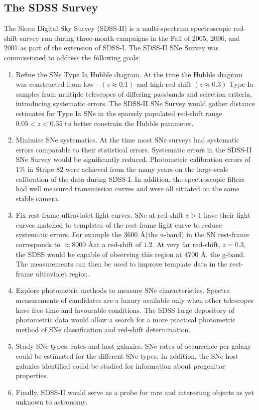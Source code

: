 \subsection{The SDSS Survey}
The Sloan Digital Sky Survey (SDSS-II) is a multi-spectrum spectroscopic red-shift survey run during three-month campaigns in the Fall of 2005, 2006, and 2007 as part of the extension of SDSS-I.
The SDSS-II SNe Survey was commissioned to address the following goals\citep{abazajian2009seventh}:
\begin{enumerate}
\item Refine the SNe Type Ia Hubble diagram.
At the time the Hubble diagram  was constructed from low - $(z \approx 0.1)$ and high-red-shift $(z \approx 0.3)$ Type Ia samples from multiple telescopes of differing passbands and selection criteria, introducing systematic errors.
The SDSS-II SNe Survey would gather distance estimates for Type Ia SNe in the sparsely populated red-shift range $0.05 < z < 0.35$ to better constrain the Hubble parameter.
\item Minimise SNe systematics.
At the time most SNe surveys had systematic errors comparable to their statistical errors.
Systematic errors in the SDSS-II SNe Survey would be significantly reduced.
Photometric calibration errors of $1\%$ in Stripe 82 were achieved from the many years on the large-scale calibration of the data during SDSS-I.
In addition, the spectroscopic filters had well measured transmission curves and were all situated on the same stable camera.
\item Fix rest-frame ultraviolet light curves.
SNe at red-shift $z > 1$ have their light curves matched to templates of the rest-frame light curve to reduce systematic errors.
For example the 3600 \AA (the u-band) in the SN rest-frame corresponds to $ \approx 8000$ \AA at a red-shift of $1.2$.
At very far red-shift, $z = 0.3$, the SDSS would be capable of observing this region at $4700$ \AA, the g-band.
The measurements can then be used to improve template data in the rest-frame ultraviolet region.
\item Explore photometric methods to measure SNe characteristics.
Spectra measurements of candidates are a luxury available only when other telescopes have free time and favourable conditions.
The SDSS large depository of photometric data would allow a search for a more practical photometric method of SNe classification and red-shift determination.
\item Study SNe types, rates and host galaxies.
SNe rates of occurrence per galaxy could be estimated for the different SNe types.
In addition, the SNe host galaxies identified could be studied for information about progenitor properties.
\item Finally, SDSS-II would serve as a probe for rare and interesting objects as yet unknown to astronomy.
\end{enumerate}

